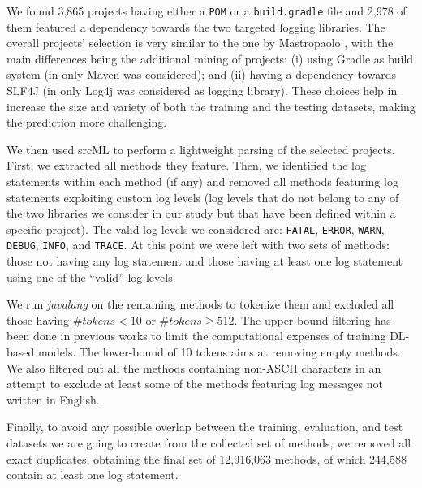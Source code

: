 We found 3,865 projects having either a \texttt{POM} or a \texttt{build.gradle} file and 2,978 of them featured a dependency towards the two targeted logging libraries. The overall projects' selection is very similar to the one by Mastropaolo \etal \cite{mastropaolo2022using}, with the main differences being the additional mining of projects: (i) using Gradle as build system (in \cite{mastropaolo2022using} only Maven was considered); and (ii) having a dependency towards SLF4J (in \cite{mastropaolo2022using} only Log4j was considered as logging library). These choices help in increase the size and variety of both the training and the testing datasets, making the prediction more challenging. 

We then used srcML \cite{srcml} to perform a lightweight parsing of the selected projects. First, we extracted all \java methods they feature. Then, we identified the log statements within each method (if any) and removed all methods featuring log statements exploiting custom log levels (\ie log levels that do not belong to any of the two libraries we consider in our study but that have been defined within a specific project). The valid log levels we considered are: \texttt{FATAL}, \texttt{ERROR}, \texttt{WARN}, \texttt{DEBUG}, \texttt{INFO}, and \texttt{TRACE}. At this point we were left with two sets of methods: those not having any log statement and those having at least one log statement using one of the ``valid'' log levels.

We run \emph{javalang} \cite{javalang} on the remaining methods to tokenize them and excluded all those having $\#tokens < 10$ or $\#tokens \geq 512$. The upper-bound filtering has been done in previous works \cite{ADD_CITATIONS_FROM_OTHER_GROUPS,mastropaolo2021empirical,tufano2021automating,ciniselli2021empirical} to limit the computational expenses of training DL-based models. The lower-bound of 10 tokens aims at removing empty methods. We also filtered out all the methods containing non-ASCII characters in an attempt to exclude at least some of the methods featuring log messages not written in English. 


Finally, to avoid any possible overlap between the training, evaluation, and test datasets we are going to create from the collected set of methods, we removed all exact duplicates, obtaining the final set of 12,916,063 \java methods, of which 244,588 contain at least one log statement. 

